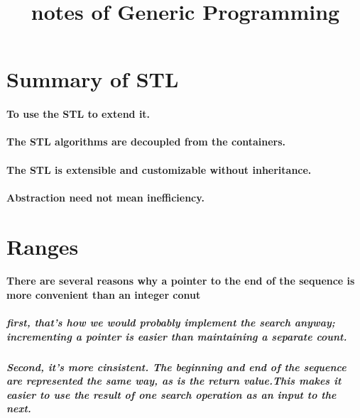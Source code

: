 \documentclass[UTF8]{article}
\title{notes of Generic Programming}
\author{}
\begin{document}
\section{Summary of STL}%
\label{sec:summary}
    \paragraph{To use the STL to extend it.}%
    \label{par:to_use_the_stl_to_extend_it_}
    \paragraph{The STL algorithms are decoupled from the containers.}%
    \label{par:the_stl_algorithms_are_decoupled_from_the_containers_}
    \paragraph{The STL is extensible and customizable without inheritance.}%
    \label{par:the_stl_is_extensible_and_customizable_without_inheritance_}
    \paragraph{Abstraction need not mean inefficiency.}%
    \label{par:abstraction_need_not_mean_inefficiency_}
\section{Ranges}%
\label{sec:}

    \paragraph{There are several reasons why a pointer to the end of the sequence is more convenient than an integer conut}%
    \label{par:there_are_several_reasons_why_a_pointer_to_the_end_of_the_sequence_is_more_convenient_than_an_integer_conut}
        \subparagraph{first, that's how we would probably implement the search anyway; incrementing a pointer is easier than maintaining a separate count.}%
        \label{par:first_that_s_how_we_would_probably_implement_the_search_anyway_incrementing_a_pointer_is_easier_than_maintaining_a_separate_count_}
        \subparagraph{Second, it's more cinsistent. The beginning and end of the sequence are represented the same way, as is the return value.This makes it easier to use the result of one search operation as an input to the next.}%
        \label{par:second_it_s_more_cinsistent_the_beginning_and_end_of_the_sequence_are_represented_the_same_way_as_is_the_return_value_this_makes_it_easier_to_use_the_result_of_one_search_operation_as_an_input_to_the_next_}
\end{document}

